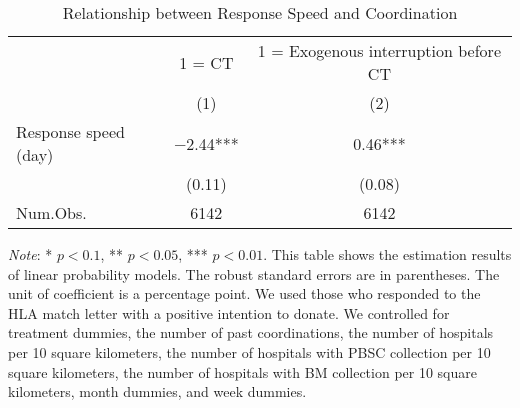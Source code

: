 \documentclass[12pt, a4paper]{article}
\begin{document}
\begin{table}[H]

\caption{\label{tab:response-speed-CT}Relationship between Response Speed and Coordination}
\centering
\fontsize{9}{11}\selectfont
\begin{threeparttable}
\begin{tabular}[t]{lcc}
\toprule
\multicolumn{1}{c}{ } & \multicolumn{1}{c}{1 = CT} & \multicolumn{1}{c}{1 = Exogenous interruption before CT} \\
\cmidrule(l{3pt}r{3pt}){2-2} \cmidrule(l{3pt}r{3pt}){3-3}
  & (1) & (2)\\
\midrule
Response speed (day) & \num{-2.44}*** & \num{0.46}***\\
 & (\num{0.11}) & (\num{0.08})\\
\midrule
Num.Obs. & \num{6142} & \num{6142}\\
\bottomrule
\end{tabular}
\begin{tablenotes}
\item \emph{Note}: * $p < 0.1$, ** $p < 0.05$, *** $p < 0.01$. This table shows the estimation results of linear probability models. The robust standard errors are in parentheses. The unit of coefficient is a percentage point. We used those who responded to the HLA match letter with a positive intention to donate. We controlled for treatment dummies, the number of past coordinations, the number of hospitals per 10 square kilometers, the number of hospitals with PBSC collection per 10 square kilometers, the number of hospitals with BM collection per 10 square kilometers, month dummies, and week dummies.
\end{tablenotes}
\end{threeparttable}
\end{table}
\end{document}
